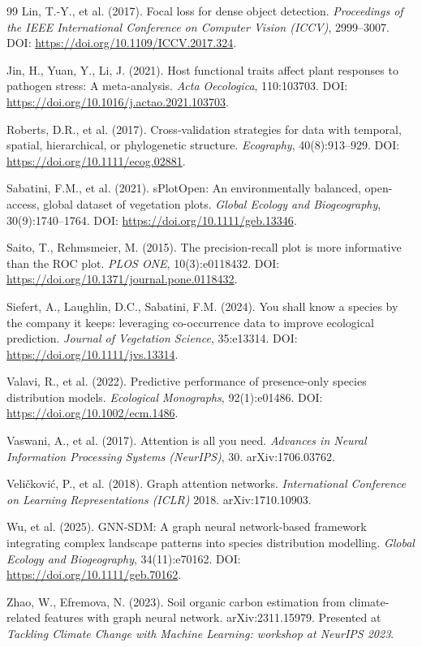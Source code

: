 \documentclass[a4paper,fleqn]{cas-sc}
\begin{document}
\begin{thebibliography}{99}
 Lin, T.-Y., et al. (2017). Focal loss for dense object detection. \textit{Proceedings of the IEEE International Conference on Computer Vision (ICCV)}, 2999--3007. DOI: \url{https://doi.org/10.1109/ICCV.2017.324}.

 Jin, H., Yuan, Y., Li, J. (2021). Host functional traits affect plant responses to pathogen stress: A meta-analysis. \textit{Acta Oecologica}, 110:103703. DOI: \url{https://doi.org/10.1016/j.actao.2021.103703}.

 Roberts, D.R., et al. (2017). Cross-validation strategies for data with temporal, spatial, hierarchical, or phylogenetic structure. \textit{Ecography}, 40(8):913--929. DOI: \url{https://doi.org/10.1111/ecog.02881}.

 Sabatini, F.M., et al. (2021). sPlotOpen: An environmentally balanced, open-access, global dataset of vegetation plots. \textit{Global Ecology and Biogeography}, 30(9):1740--1764. DOI: \url{https://doi.org/10.1111/geb.13346}.

 Saito, T., Rehmsmeier, M. (2015). The precision-recall plot is more informative than the ROC plot. \textit{PLOS ONE}, 10(3):e0118432. DOI: \url{https://doi.org/10.1371/journal.pone.0118432}.

 Siefert, A., Laughlin, D.C., Sabatini, F.M. (2024). You shall know a species by the company it keeps: leveraging co-occurrence data to improve ecological prediction. \textit{Journal of Vegetation Science}, 35:e13314. DOI: \url{https://doi.org/10.1111/jvs.13314}.

 Valavi, R., et al. (2022). Predictive performance of presence-only species distribution models. \textit{Ecological Monographs}, 92(1):e01486. DOI: \url{https://doi.org/10.1002/ecm.1486}.

 Vaswani, A., et al. (2017). Attention is all you need. \textit{Advances in Neural Information Processing Systems (NeurIPS)}, 30. arXiv:1706.03762.

 Veli\v{c}kovi\'c, P., et al. (2018). Graph attention networks. \textit{International Conference on Learning Representations (ICLR)} 2018. arXiv:1710.10903.

 Wu, et al. (2025). GNN-SDM: A graph neural network-based framework integrating complex landscape patterns into species distribution modelling. \textit{Global Ecology and Biogeography}, 34(11):e70162. DOI: \url{https://doi.org/10.1111/geb.70162}.

 Zhao, W., Efremova, N. (2023). Soil organic carbon estimation from climate-related features with graph neural network. arXiv:2311.15979. Presented at \textit{Tackling Climate Change with Machine Learning: workshop at NeurIPS 2023}.

\end{thebibliography}
\end{document}
